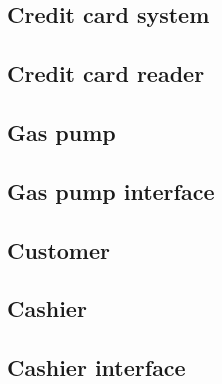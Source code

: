
\subsection{Credit card system}



\subsection{Credit card reader}


\subsection{Gas pump}


\subsection{Gas pump interface}


\subsection{Customer}


\subsection{Cashier}


\subsection{Cashier interface}

